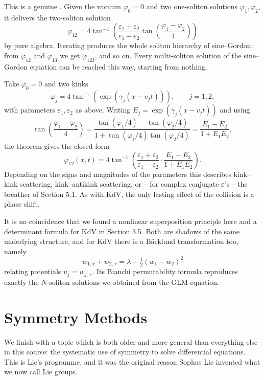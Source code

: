 \documentclass[a4paper]{scrartcl}
\begin{document}
This is a genuine . Given the vacuum $\varphi_0 = 0$ and two one-soliton solutions $\varphi_1, \varphi_2$, it delivers the two-soliton solution
$$
\varphi_{12} = 4\tan^{-1}\left(\frac{\varepsilon_1+\varepsilon_2}{\varepsilon_1-\varepsilon_2}\tan\left(\frac{\varphi_1-\varphi_2}{4}\right)\right)
$$
by pure algebra. Iterating produces the whole soliton hierarchy of sine--Gordon: from $\varphi_{12}$ and $\varphi_{13}$ we get $\varphi_{123}$, and so on. Every multi-soliton solution of the sine--Gordon equation can be reached this way, starting from nothing.

\begin{example}
	Take $\varphi_0 = 0$ and two kinks
	$$
	\varphi_j = 4\tan^{-1}\left(\exp\left(\gamma_j(x - v_jt)\right)\right), \qquad j = 1,2,
	$$
	with parameters $\varepsilon_1,\varepsilon_2$ as above. Writing $E_j = \exp(\gamma_j(x-v_jt))$ and using
	$$
	\tan\left(\frac{\varphi_1-\varphi_2}{4}\right) = \frac{\tan(\varphi_1/4) - \tan(\varphi_2/4)}{1 + \tan(\varphi_1/4)\tan(\varphi_2/4)} = \frac{E_1-E_2}{1+E_1E_2},
	$$
	the theorem gives the closed form
	$$
	\varphi_{12}(x,t) = 4\tan^{-1}\left(\frac{\varepsilon_1+\varepsilon_2}{\varepsilon_1-\varepsilon_2}\cdot\frac{E_1-E_2}{1+E_1E_2}\right).
	$$
	Depending on the signs and magnitudes of the parameters this describes kink--kink scattering, kink--antikink scattering, or -- for complex conjugate $\varepsilon$'s -- the breather of Section 5.1. As with KdV, the only lasting effect of the collision is a phase shift.
\end{example}

\begin{remark}
	It is no coincidence that we found a nonlinear superposition principle here and a determinant formula for KdV in Section 3.5. Both are shadows of the same underlying structure, and for KdV there is a B\"acklund transformation too, namely
	$$
	w_{1,x} + w_{2,x} = \lambda - \tfrac{1}{2}\left(w_1 - w_2\right)^2
	$$
	relating potentials $u_j = w_{j,x}$. Its Bianchi permutability formula reproduces exactly the $N$-soliton solutions we obtained from the GLM equation.
\end{remark}

\section{Symmetry Methods}

We finish with a topic which is both older and more general than everything else in this course: the systematic use of symmetry to solve differential equations. This is Lie's programme, and it was the original reason Sophus Lie invented what we now call Lie groups.
\end{document}
